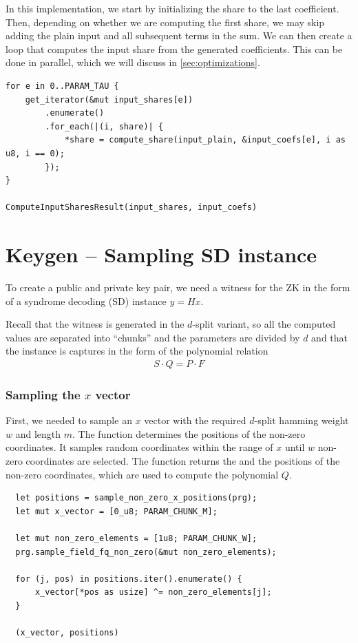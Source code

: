 \documentclass[11pt]{report}
\theoremstyle{definition}
\theoremstyle{plain}
\begin{document}
In this implementation, we start by initializing the share to the last coefficient. Then, depending on whether we are computing the first share, we may skip adding the plain input and all subsequent terms in the sum.
We can then create a loop that computes the input share from the generated coefficients. This can be done in parallel, which we will discuss in \autoref{sec:optimizations}.

\begin{verbatim}
for e in 0..PARAM_TAU {
    get_iterator(&mut input_shares[e])
        .enumerate()
        .for_each(|(i, share)| {
            *share = compute_share(input_plain, &input_coefs[e], i as u8, i == 0);
        });
}

ComputeInputSharesResult(input_shares, input_coefs)
\end{verbatim}

\section{Keygen -- Sampling SD instance}\label{sub:witness_generation}

To create a public and private key pair, we need a witness for the ZK in the form of a syndrome decoding (SD) instance $y = Hx$.

Recall that the witness is generated in the $d$-split variant, so all the computed values are separated into ``chunks'' and the parameters are divided by $d$ and that the instance is captures in the form of the polynomial relation
\begin{align*}
  S\cdot Q = P\cdot F
\end{align*}

\subsubsection{Sampling the $x$ vector}

First, we needed to sample an $x$ vector with the required $d$-split hamming weight $w$ and length $m$. The function  determines the positions of the non-zero coordinates. It samples random coordinates within the range of $x$ until $w$ non-zero coordinates are selected. The function returns the  and the positions of the non-zero coordinates, which are used to compute the polynomial $Q$.

\begin{verbatim}
  let positions = sample_non_zero_x_positions(prg);
  let mut x_vector = [0_u8; PARAM_CHUNK_M];
  
  let mut non_zero_elements = [1u8; PARAM_CHUNK_W];
  prg.sample_field_fq_non_zero(&mut non_zero_elements);

  for (j, pos) in positions.iter().enumerate() {
      x_vector[*pos as usize] ^= non_zero_elements[j];
  }

  (x_vector, positions)
\end{verbatim}
\end{document}
